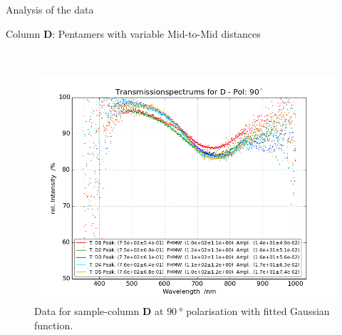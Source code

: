 \documentclass[pdftex, a4paper,11pt, twoside, UKenglish]{report}
\begin{document}
\begin{chapter}{Analysis of the data}
\begin{section}{Column \textbf{D}: Pentamers with variable Mid-to-Mid
        distances}
\begin{figure}[ht!]
\begin{minipage}{.95\textwidth}
          \label{fig:TransspecFIT_DPol0}
        \end{minipage}\\
        \begin{minipage}{.95\textwidth}
          \centering
          \includegraphics[width=\textwidth]
              {Figures/TransspecFIT_DPol90.png}
          \caption{Data for sample-column \textbf{D} at $\SI{90}{\degree}$
              polarisation with fitted Gaussian function.}
          \label{fig:TransspecFIT_DPol90}
        \end{minipage}
      \end{figure}
      
    \end{section}
    
    
    

\end{chapter}
\end{document}
